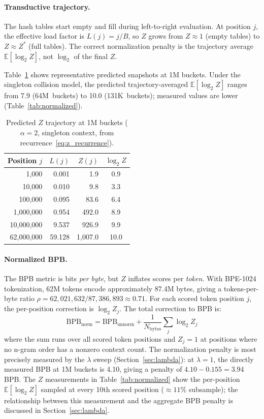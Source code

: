 \documentclass[11pt]{article}
\newcommand{\bpb}{\text{BPB}}
\newcommand{\E}{\mathbb{E}}
\begin{document}
\paragraph{Transductive trajectory.} The hash tables start empty and fill during left-to-right evaluation. At position $j$, the effective load factor is $L(j) = j/B$, so $Z$ grows from $Z \approx 1$ (empty tables) to $Z \approx Z^*$ (full tables). The correct normalization penalty is the trajectory average $\E[\log_2 Z]$, not $\log_2$ of the final $Z$.

Table~\ref{tab:trajectory} shows representative predicted snapshots at 1M buckets. Under the singleton collision model, the predicted trajectory-averaged $\E[\log_2 Z]$ ranges from 7.9 (64M~buckets) to 10.0 (131K~buckets); measured values are lower (Table~\ref{tab:normalized}).

\begin{table}[h]
\centering
\caption{Predicted $Z$ trajectory at 1M buckets ($\alpha = 2$, singleton context, from recurrence~\eqref{eq:z_recurrence}).}
\label{tab:trajectory}
\begin{tabular}{rrrc}
\toprule
Position $j$ & $L(j)$ & $Z(j)$ & $\log_2 Z$ \\
\midrule
1,000 & 0.001 & 1.9 & 0.9 \\
10,000 & 0.010 & 9.8 & 3.3 \\
100,000 & 0.095 & 83.6 & 6.4 \\
1,000,000 & 0.954 & 492.0 & 8.9 \\
10,000,000 & 9.537 & 926.9 & 9.9 \\
62,000,000 & 59.128 & 1,007.0 & 10.0 \\
\bottomrule
\end{tabular}
\end{table}

\paragraph{Normalized BPB.} The BPB metric is bits \emph{per byte}, but $Z$ inflates scores per \emph{token}. With BPE-1024 tokenization, 62M tokens encode approximately 87.4M bytes, giving a tokens-per-byte ratio $\rho = 62{,}021{,}632 / 87{,}386{,}893 \approx 0.71$. For each scored token position $j$, the per-position correction is $\log_2 Z_j$. The total correction to BPB is:
\begin{equation}
\bpb_{\text{norm}} = \bpb_{\text{unnorm}} + \frac{1}{N_{\text{bytes}}} \sum_j \log_2 Z_j
\label{eq:bpb_norm}
\end{equation}
where the sum runs over all scored token positions and $Z_j = 1$ at positions where no n-gram order has a nonzero context count. The normalization penalty is most precisely measured by the $\lambda$ sweep (Section~\ref{sec:lambda}): at $\lambda = 1$, the directly measured BPB at 1M buckets is 4.10, giving a penalty of $4.10 - 0.155 = 3.94$ BPB. The $Z$ measurements in Table~\ref{tab:normalized} show the per-position $\E[\log_2 Z]$ sampled at every 10th scored position (${\approx}11\%$ subsample); the relationship between this measurement and the aggregate BPB penalty is discussed in Section~\ref{sec:lambda}.
\end{document}
